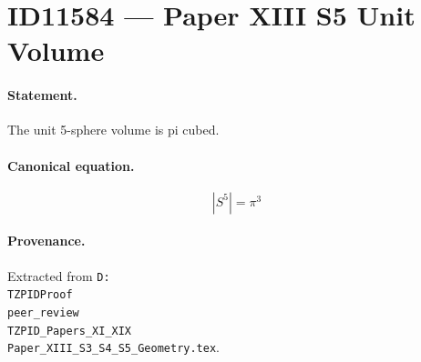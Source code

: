 \section*{ID11584 --- Paper XIII S5 Unit Volume}

\paragraph{Statement.}
The unit 5-sphere volume is pi cubed.

\paragraph{Canonical equation.}
\[
|S^5|=\pi^3
\]

\paragraph{Provenance.}
Extracted from \texttt{D:\\TZPIDProof\\peer\_review\\TZPID\_Papers\_XI\_XIX\\Paper\_XIII\_S3\_S4\_S5\_Geometry.tex}.
